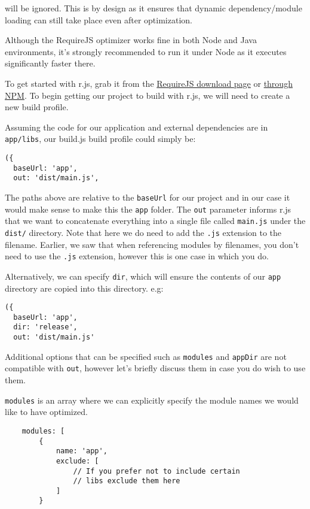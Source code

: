 \documentclass[9pt]{book}
\begin{document}
will be ignored. This is by design as it ensures that dynamic
dependency/module loading can still take place even after optimization.

Although the RequireJS optimizer works fine in both Node and Java
environments, it's strongly recommended to run it under Node as it
executes significantly faster there.

To get started with r.js, grab it from the
\href{http://requirejs.org/docs/download.html\#rjs}{RequireJS download
page} or
\href{http://requirejs.org/docs/optimization.html\#download}{through
NPM}. To begin getting our project to build with r.js, we will need to
create a new build profile.

Assuming the code for our application and external dependencies are in
\texttt{app/libs}, our build.js build profile could simply be:

\begin{verbatim}
({
  baseUrl: 'app',
  out: 'dist/main.js',
\end{verbatim}

The paths above are relative to the \texttt{baseUrl} for our project and
in our case it would make sense to make this the \texttt{app} folder.
The \texttt{out} parameter informs r.js that we want to concatenate
everything into a single file called \texttt{main.js} under the
\texttt{dist/} directory. Note that here we do need to add the
\texttt{.js} extension to the filename. Earlier, we saw that when
referencing modules by filenames, you don't need to use the \texttt{.js}
extension, however this is one case in which you do.

Alternatively, we can specify \texttt{dir}, which will ensure the
contents of our \texttt{app} directory are copied into this directory.
e.g:

\begin{verbatim}
({
  baseUrl: 'app',
  dir: 'release',
  out: 'dist/main.js'
\end{verbatim}

Additional options that can be specified such as \texttt{modules} and
\texttt{appDir} are not compatible with \texttt{out}, however let's
briefly discuss them in case you do wish to use them.

\texttt{modules} is an array where we can explicitly specify the module
names we would like to have optimized.

\begin{verbatim}
    modules: [
        {
            name: 'app',
            exclude: [
                // If you prefer not to include certain 
                // libs exclude them here
            ]
        }
\end{verbatim}
\end{document}
